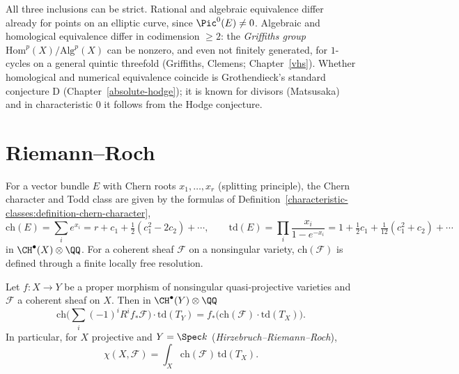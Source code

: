 \begin{remark}\label{intersection-theory:remark-griffiths-group}
All three inclusions can be strict. Rational and algebraic equivalence differ already for points on an elliptic curve, since $\Pic^0(E) \neq 0$. Algebraic and homological equivalence
differ in codimension $\geq 2$: the \emph{Griffiths group} $\mathrm{Hom}^p(X)/\mathrm{Alg}^p(X)$ can be nonzero, and even not finitely generated, for $1$-cycles on a general quintic threefold
(Griffiths, Clemens; Chapter~\ref{vhs}). Whether homological and numerical equivalence coincide is Grothendieck's standard conjecture D
(Chapter~\ref{absolute-hodge}); it is known for divisors (Matsusaka) and in characteristic $0$ it follows from the Hodge conjecture.
\end{remark}

\section{Riemann--Roch}\label{intersection-theory:section-riemann-roch}

\begin{definition}\label{intersection-theory:definition-chern-character-todd}
For a vector bundle $E$ with Chern roots $x_1, \ldots, x_r$ (splitting principle), the Chern character and Todd class are given by the formulas of Definition~\ref{characteristic-classes:definition-chern-character},
\[
\mathrm{ch}(E) = \sum_ie^{x_i} = r + c_1 + \tfrac12(c_1^2 - 2c_2) + \cdots, \qquad \mathrm{td}(E) = \prod_i\frac{x_i}{1 - e^{-x_i}} = 1 + \tfrac12c_1 + \tfrac{1}{12}(c_1^2 + c_2) + \cdots
\]
in $\CH^\bullet(X) \otimes \QQ$. For a coherent sheaf $\mathcal{F}$ on a nonsingular variety, $\mathrm{ch}(\mathcal{F})$ is defined through a finite locally free resolution.
\end{definition}

\begin{theorem}\label{intersection-theory:theorem-grr}
Let $f \colon X \to Y$ be a proper morphism of nonsingular quasi-projective varieties and $\mathcal{F}$ a coherent sheaf on $X$. Then in $\CH^\bullet(Y) \otimes \QQ$
\[
\mathrm{ch}\Big(\sum_i(-1)^iR^if_*\mathcal{F}\Big)\cdot\mathrm{td}(T_Y) = f_*\big(\mathrm{ch}(\mathcal{F})\cdot\mathrm{td}(T_X)\big).
\]
In particular, for $X$ projective and $Y = \Spec k$ (\emph{Hirzebruch--Riemann--Roch}),
\[
\chi(X, \mathcal{F}) = \int_X\mathrm{ch}(\mathcal{F})\,\mathrm{td}(T_X) .
\]
\end{theorem}

